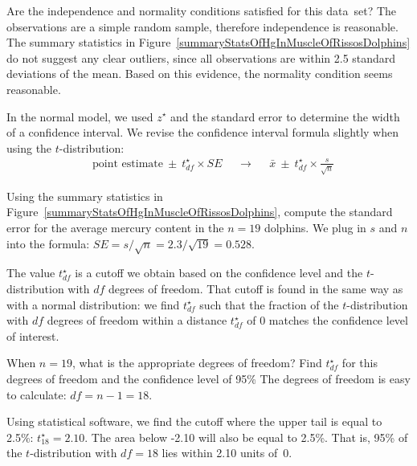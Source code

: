 \begin{examplewrap}
\begin{nexample}{Are the independence and
    normality conditions satisfied for this data~set?}
  The observations are a simple random sample,
  therefore independence is reasonable.
  The summary statistics in
  Figure~\ref{summaryStatsOfHgInMuscleOfRissosDolphins}
  do not suggest any clear outliers, since
  all observations are within 2.5 standard deviations
  of the mean.
  Based on this evidence, the normality condition
  seems reasonable.
\end{nexample}
\end{examplewrap}

In the normal model, we used $z^{\star}$ and the standard error to determine the width of a confidence interval. We revise the confidence interval formula slightly when using the $t$-distribution:
\begin{align*}
&\text{point estimate} \ \pm\  t^{\star}_{df} \times SE
&&\to
&&\bar{x} \ \pm\  t^{\star}_{df} \times \frac{s}{\sqrt{n}}
\end{align*}

\begin{examplewrap}
\begin{nexample}{Using the summary statistics in
    Figure~\ref{summaryStatsOfHgInMuscleOfRissosDolphins},
    compute the standard error for the average
    mercury content in the $n = 19$ dolphins.}
  We plug in $s$ and $n$ into the formula:
  $
  SE
    = s / \sqrt{n}
    = 2.3 / \sqrt{19}
    = 0.528
  $.
\end{nexample}
\end{examplewrap}

The value $t^{\star}_{df}$ is a cutoff we obtain based on the
confidence level and the $t$-distribution with $df$ degrees
of freedom.
That cutoff is found in the same way as with a normal
distribution: we find $t^{\star}_{df}$ such that
the fraction of the $t$-distribution with $df$ degrees
of freedom within a distance $t^{\star}_{df}$
of 0 matches the confidence level of interest.

\begin{examplewrap}
\begin{nexample}{When $n = 19$, what is the appropriate
    degrees of freedom?
    Find $t^{\star}_{df}$ for this degrees of freedom
    and the confidence level of 95\%}
  The degrees of freedom is easy to calculate:
  $df = n - 1 = 18$.
  
  Using statistical software, we find the cutoff where
  the upper tail is equal to 2.5\%:
  $t^{\star}_{18} = 2.10$.
  The area below -2.10 will also be equal to 2.5\%.
  That is, 95\% of the $t$-distribution with $df = 18$
  lies within 2.10 units of~0.
\end{nexample}
\end{examplewrap}

